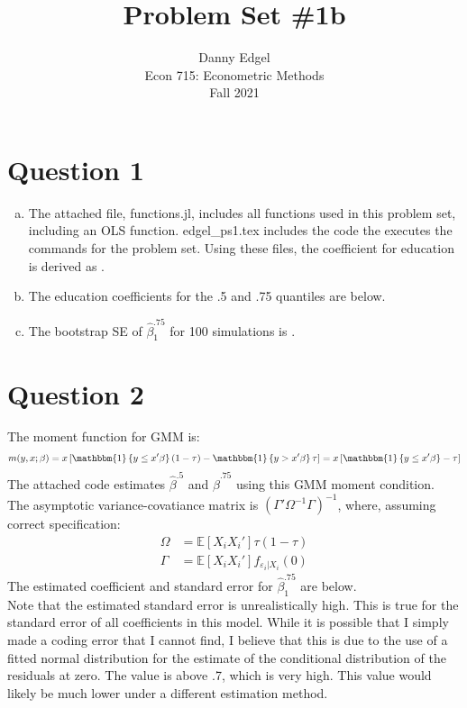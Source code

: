 \documentclass{article}
\newcommand{\bhat}{\hat{\beta}}
\newcommand{\one}[1]{\mathbbm{1}\left\{#1\right\}}
\newcommand{\E}[1]{\mathbb{E}\left[#1\right]}%
\begin{document}
\title{	Problem Set \#1b }
\author{ 	Danny Edgel 					\\ 
			Econ 715: Econometric Methods	\\
			Fall 2021						
		}
\maketitle\thispagestyle{empty}

\section*{Question 1}

\begin{enumerate}[(a)]
    \item The attached file, functions.jl, includes all functions used in this problem set, including an OLS function. edgel\_ps1.tex includes the code the executes the commands for the problem set. Using these files, the coefficient for education is derived as .

    \item The education coefficients for the .5 and .75 quantiles are below. \[
        
    \]

    \item The bootstrap SE of $\bhat_1^{.75}$ for 100 simulations is .
\end{enumerate}

\section*{Question 2}

The moment function for GMM is:\[
        m(y, x; \beta) = x\left[\one{y\leq x'\beta}(1-\tau) - \one{y>x'\beta}\tau\right] = x\left[\one{y\leq x'\beta} - \tau\right]
    \]
The attached code estimates $\bhat^{.5}$ and $\bhat^{.75}$ using this GMM moment condition. \medskip \\
The asymptotic variance-covatiance matrix is $\left(\Gamma'\Omega^{-1}\Gamma\right)^{-1}$, where, assuming correct specification: \begin{align*}
    \Omega &= \E{X_iX_i'}\tau(1-\tau)               \\
    \Gamma &= \E{X_iX_i'}f_{\varepsilon_i|X_i}(0)
\end{align*}
The estimated coefficient and standard error for $\bhat_1^{.75}$ are below. \[
        
\]
Note that the estimated standard error is unrealistically high. This is true for the standard error of all coefficients in this model. While it is possible that I simply made a coding error that I cannot find, I believe that this is due to the use of a fitted normal distribution for the estimate of the conditional distribution of the residuals at zero. The value is above .7, which is very high. This value would likely be much lower under a different estimation method.
\end{document}
